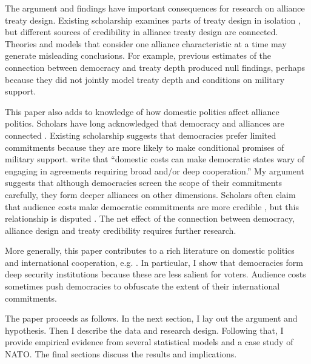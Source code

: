 \documentclass[12pt]{article}
\begin{document}
The argument and findings have important consequences for research on alliance treaty design. 
Existing scholarship examines parts of treaty design in isolation \citep{Benson2012, Mattes2012, Chibaetal2015}, but different sources of credibility in alliance treaty design are connected. 
Theories and models that consider one alliance characteristic at a time may generate misleading conclusions. 
For example, previous estimates of the connection between democracy and treaty depth produced null findings, perhaps because they did not jointly model treaty depth and conditions on military support. 


This paper also adds to knowledge of how domestic politics affect alliance politics. 
Scholars have long acknowledged that democracy and alliances are connected \citep{LaiReiter2000, GiblerWolford2006, Mattes2012, Warren2016, McManusYarhi-Milo2017}. 
Existing scholarship suggests that democracies prefer limited commitments \citep{Mattes2012, Chibaetal2015} because they are more likely to make conditional promises of military support. 
\citet{Chibaetal2015} write that ``domestic costs can make democratic states wary of engaging in agreements requiring broad and/or deep cooperation.'' 
My argument suggests that although democracies screen the scope of their commitments carefully, they form deeper alliances on other dimensions.  
Scholars often claim that audience costs make democratic commitments are more credible \citep{Gaubatz1996, Leedsetal2009, DigiuseppePoast2016}, but this relationship is disputed \citep{GartzkeGleditsch2004, DownesSechser2012}. 
The net effect of the connection between democracy, alliance design and treaty credibility requires further research. 


More generally, this paper contributes to a rich literature on domestic politics and international cooperation, e.g. \citep{DownesRocke1995, Fearon1998, Leeds1999, MattesRodriguez2014}. 
In particular, I show that democracies form deep security institutions because these are less salient for voters. 
Audience costs sometimes push democracies to obfuscate the extent of their international commitments. 


The paper proceeds as follows. 
In the next section, I lay out the argument and hypothesis. 
Then I describe the data and research design. 
Following that, I provide empirical evidence from several statistical models and a case study of NATO. 
The final sections discuss the results and implications. 
\end{document}
